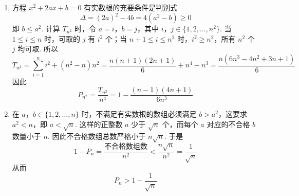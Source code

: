 \begin{solution}
\begin{enumerate}
\item 方程 \(x^2+2ax+b=0\) 有实数根的充要条件是判别式
\[
\Delta=(2a)^2-4b=4(a^2-b)\ge0
\]
即 \(b\le a^2\). 计算 \(T_{n^2}\) 时，令 \(a=i\)，\(b=j\)，其中 \(i\)，\(j\in\{1,2,\ldots,n^2\}\). 当 \(1\le i\le n\) 时，可取的 \(j\) 有 \(i^2\) 个；当 \(n+1\le i\le n^2\) 时，\(i^2\ge n^2\)，所有 \(n^2\) 个 \(j\) 均可取. 所以
\[
T_{n^2}
=\sum_{i=1}^{n}i^2+(n^2-n)n^2
=\frac{n(n+1)(2n+1)}6+n^4-n^3
=\frac{n(6n^3-4n^2+3n+1)}6
\]
因此
\[
P_{n^2}=\frac{T_{n^2}}{n^4}
=1-\frac{(n-1)(4n+1)}{6n^3}
\]

\item 在 \(a\)，\(b\in\{1,2,\ldots,n\}\) 时，不满足有实数根的数组必须满足 \(b>a^2\)，这要求 \(a^2<n\)，即 \(a<\sqrt n\). 这样的正整数 \(a\) 少于 \(\sqrt n\) 个，而每个 \(a\) 对应的不合格 \(b\) 数量小于 \(n\). 因此不合格数组总数严格小于 \(n\sqrt n\). 于是
\[
1-P_n
=\frac{\text{不合格数组数}}{n^2}
<\frac{n\sqrt n}{n^2}
=\frac1{\sqrt n}
\]
从而
\[
P_n>1-\frac1{\sqrt n}
\]
\end{enumerate}
\end{solution}

